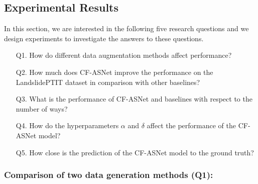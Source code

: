 \documentclass{ieeeaccess}
\newcommand{\datta}[1]{\textcolor{blue}{#1}}
\begin{document}
\subsection{Experimental Results}

In this section, we are interested in the following five research questions and we design experiments to investigate the answers to these questions.

\begin{itemize}
    \item[Q1.] How do different data augmentation methods affect performance?
    
    \item[Q2.] How much does CF-ASNet improve the performance on the LandslidePTIT dataset in comparison with other baselines?
    
    \item[Q3.] What is the performance of CF-ASNet and baselines with respect to the number of ways?
    
    \item[Q4.] How do the hyperparameters $\alpha$ and $\delta$ affect the performance of the CF-ASNet model?
    \item[Q5.] How close is the prediction of the CF-ASNet model to the ground truth?
    
\end{itemize}

\subsubsection{Comparison of two data generation methods (Q1):}
\end{document}
